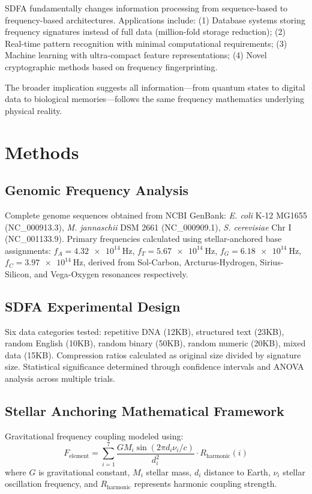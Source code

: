 \documentclass[fleqn,10pt,lineno]{article}
\newcommand{\sdfa}{\textsc{SDFA}}
\begin{document}
\sdfa{} fundamentally changes information processing from sequence-based to frequency-based architectures. Applications include: (1) Database systems storing frequency signatures instead of full data (million-fold storage reduction); (2) Real-time pattern recognition with minimal computational requirements; (3) Machine learning with ultra-compact feature representations; (4) Novel cryptographic methods based on frequency fingerprinting.

The broader implication suggests all information—from quantum states to digital data to biological memories—follows the same frequency mathematics underlying physical reality.

\section{Methods}

\subsection{Genomic Frequency Analysis}

Complete genome sequences obtained from NCBI GenBank: \textit{E. coli} K-12 MG1655 (NC\_000913.3), \textit{M. jannaschii} DSM 2661 (NC\_000909.1), \textit{S. cerevisiae} Chr I (NC\_001133.9). Primary frequencies calculated using stellar-anchored base assignments: $f_A = \SI{4.32e14}{\hertz}$, $f_T = \SI{5.67e14}{\hertz}$, $f_G = \SI{6.18e14}{\hertz}$, $f_C = \SI{3.97e14}{\hertz}$, derived from Sol-Carbon, Arcturus-Hydrogen, Sirius-Silicon, and Vega-Oxygen resonances respectively.

\subsection{\sdfa{} Experimental Design}

Six data categories tested: repetitive DNA (12KB), structured text (23KB), random English (10KB), random binary (50KB), random numeric (20KB), mixed data (15KB). Compression ratios calculated as original size divided by signature size. Statistical significance determined through confidence intervals and ANOVA analysis across multiple trials.

\subsection{Stellar Anchoring Mathematical Framework}

Gravitational frequency coupling modeled using:
$$F_{\text{element}} = \sum_{i=1}^{7} \frac{G M_i \sin(2\pi d_i \nu_i / c)}{d_i^2} \cdot R_{\text{harmonic}}(i)$$
where $G$ is gravitational constant, $M_i$ stellar mass, $d_i$ distance to Earth, $\nu_i$ stellar oscillation frequency, and $R_{\text{harmonic}}$ represents harmonic coupling strength.
\end{document}
